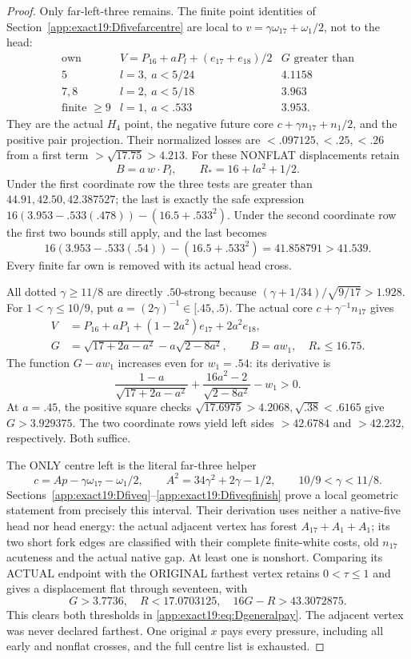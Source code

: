 \documentclass[11pt]{article}
\theoremstyle{definition}
\theoremstyle{remark}
\begin{document}
\begin{proof}
Only far-left-three remains.
The finite point identities of
Section~\ref{app:exact19:Dfivefarcentre} are local to
\(v=\gamma\omega_{17}+\omega_1/2\), not to the head:
\[
\begin{array}{c|c|c}
 \text{own}&V=P_{16}+aP_l+(e_{17}+e_{18})/2&G\text{ greater than}\\ \hline
 5&l=3,\ a<5/24&4.1158\\
 7,8&l=2,\ a<5/18&3.963\\
 \text{finite }\ge9&l=1,\ a<.533&3.953 .
\end{array}
\]
They are the actual \(H_4\) point, the negative future core
\(c+\gamma n_{17}+n_1/2\), and the positive pair projection.
Their normalized losses are \(<.097125,<.25,<.26\) from a first term
\(>\sqrt{17.75}>4.213\).
For these NONFLAT displacements retain
\[
                    B=a\,w\cdot P_l,\qquad R_*=16+la^2+1/2 .
\]
Under the first coordinate row the three tests are greater than
\(44.91,42.50,42.387527\); the last is exactly the safe expression
\(16(3.953-.533(.478))-(16.5+.533^2)\).
Under the second coordinate row the first two bounds still apply,
and the last becomes
\[
             16(3.953-.533(.54))-(16.5+.533^2)=41.858791>41.539 .
\]
Every finite far own is removed with its actual head cross.

All dotted \(\gamma\ge11/8\) are directly \(.50\)-strong because
\((\gamma+1/34)/\sqrt{9/17}>1.928\).
For \(1<\gamma\le10/9\), put \(a=(2\gamma)^{-1}\in[.45,.5)\).
The actual core \(c+\gamma^{-1}n_{17}\) gives
\[
\begin{split}
 V&=P_{16}+aP_1+(1-2a^2)e_{17}+2a^2e_{18},\\
 G&=\sqrt{17+2a-a^2}-a\sqrt{2-8a^2},\qquad
 B=aw_1,\quad R_*\le16.75 .
\end{split}
\]
The function \(G-aw_1\) increases even for \(w_1=.54\): its derivative is
\[
 \frac{1-a}{\sqrt{17+2a-a^2}}
           +\frac{16a^2-2}{\sqrt{2-8a^2}}-w_1>0 .
\]
At \(a=.45\), the positive square checks
\(\sqrt{17.6975}>4.2068,\sqrt{.38}<.6165\) give \(G>3.929375\).
The two coordinate rows yield left sides \(>42.6784\) and \(>42.232\),
respectively. Both suffice.

The ONLY centre left is the literal far-three helper
\[
 c=Ap-\gamma\omega_{17}-\omega_1/2,\qquad
 A^2=34\gamma^2+2\gamma-1/2,\qquad 10/9<\gamma<11/8 .
\]
Sections~\ref{app:exact19:Dfiveq}--\ref{app:exact19:Dfiveqfinish}
prove a local geometric statement from precisely this interval.
Their derivation uses neither a native-five head nor head energy:
the actual adjacent vertex has forest \(A_{17}+A_1+A_1\); its two short
fork edges are classified with their complete finite-white costs,
old \(n_{17}\) acuteness and the actual native gap.
At least one is nonshort.
Comparing its ACTUAL endpoint with the ORIGINAL farthest vertex retains
\(0<\tau\le1\) and gives a displacement flat through seventeen, with
\[
                  G>3.7736,\quad R<17.0703125,\quad
                                16G-R>43.3072875 .
\]
This clears both thresholds in
\eqref{app:exact19:eq:Dgeneralpay}.
The adjacent vertex was never declared farthest.
One original \(x\) pays every pressure, including all early and nonflat
crosses, and the full centre list is exhausted.
\end{proof}
\end{document}
